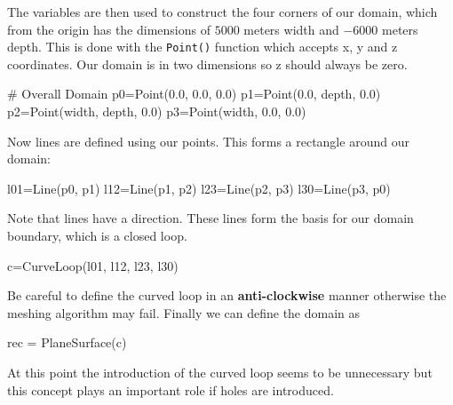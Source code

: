 The variables are then used to construct the four corners of our domain, which
from the origin has the dimensions of $5000$ meters width and $-6000$ meters
depth. This is done with the \verb|Point()| function which accepts x, y and z
coordinates. Our domain is in two dimensions so z should always be zero.
\begin{python}
# Overall Domain
p0=Point(0.0,      0.0, 0.0)
p1=Point(0.0,    depth, 0.0)
p2=Point(width, depth, 0.0)
p3=Point(width,   0.0, 0.0)
\end{python}
Now lines are defined using our points. This forms a rectangle around our
domain:
\begin{python}
l01=Line(p0, p1)
l12=Line(p1, p2)
l23=Line(p2, p3)
l30=Line(p3, p0)
\end{python}
Note that lines have a direction. These lines form the basis for our domain
boundary, which is a closed loop.
\begin{python}
c=CurveLoop(l01, l12, l23, l30)
\end{python}
Be careful to define the curved loop in an \textbf{anti-clockwise} manner
otherwise the meshing algorithm may fail.
Finally we can define the domain as
\begin{python}
rec = PlaneSurface(c)
\end{python}
At this point the introduction of the curved loop seems to be unnecessary but
this concept plays an important role if holes are introduced. 

